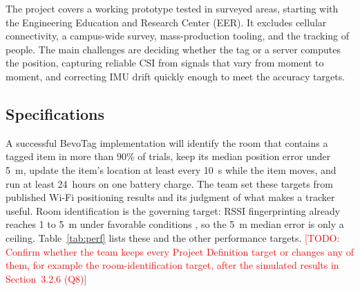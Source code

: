 \documentclass[12pt,letterpaper]{article}
\newcommand{\TODO}[1]{\textcolor{red}{[TODO: #1]}}
\begin{document}
The project covers a working prototype tested in surveyed areas, starting with the Engineering
Education and Research Center (EER). It excludes cellular connectivity, a campus-wide survey,
mass-production tooling, and the tracking of people. The main challenges are deciding whether the
tag or a server computes the position, capturing reliable CSI from signals that vary from moment to
moment, and correcting IMU drift quickly enough to meet the accuracy targets.

\subsection{Specifications}
A successful BevoTag implementation will identify the room that contains a tagged item in more than
90\% of trials, keep its median position error under 5~m, update the item's location at least every
10~s while the item moves, and run at least 24~hours on one battery charge. The team set these
targets from published Wi-Fi positioning results \cite{rssi} and its judgment of what makes a tracker
useful. Room identification is the governing target: RSSI fingerprinting already reaches 1 to 5~m
under favorable conditions \cite{rssi}, so the 5~m median error is only a ceiling.
Table~\ref{tab:perf} lists these and the other performance targets. \TODO{Confirm whether the team
keeps every Project Definition target or changes any of them, for example the room-identification
target, after the simulated results in Section~3.2.6 (Q8)}
\end{document}
